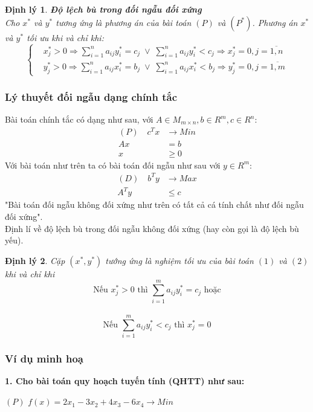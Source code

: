 \documentclass{article}
\newtheorem{dl}{Định lý}
\begin{document}
\begin{dl}{\textbf{Độ lệch bù trong đối ngẫu đối xứng}}\\
    Cho $x^*$ và $y^*$ tương ứng là phương án của bài toán $(P)$ và $(P^*)$. Phương án $x^*$ và $y^*$ tối ưu khi và chỉ khi:
    \[\left\{\begin{aligned}
        & x_j^* > 0 \Longrightarrow \displaystyle\sum\limits_{i=1}^na_{ij}y_i^*=c_j \;\vee\;\displaystyle\sum\limits_{i=1}^na_{ij}y_i^* < c_j\Longrightarrow x_j^* =0,j=\overline{1,n}\\
        & y_j^* > 0 \Longrightarrow \displaystyle\sum\limits_{i=1}^na_{ij}x_i^*=b_j \;\vee\;\displaystyle\sum\limits_{i=1}^na_{ij}x_i^* < b_j\Longrightarrow y_j^* =0,j=\overline{1,m}
    \end{aligned}\right.\]
\end{dl}
\subsubsection{Lý thuyết đối ngẫu dạng chính tắc}
Bài toán chính tắc có dạng như sau, với $A \in M_{m \times n},b \in R^m, c \in R^n$:
\begin{equation}
    \begin{split}
        (P) \quad c^Tx &\rightarrow Min \\
        Ax&=b \\
        x &\geq 0
    \end{split}
\end{equation}
Với bài toán như trên ta có bài toán đối ngẫu như sau với $y \in R^m$:
\begin{equation}
    \begin{split}
        (D) \quad b^Ty &\rightarrow Max \\
        A^Ty &\leq c
    \end{split}
\end{equation}
"Bài toán đối ngẫu không đối xứng như trên có tất cả cá tính chất như đối ngẫu đối xứng". \\
Định lí về độ lệch bù trong đối ngẫu không đối xứng (hay còn gọi là độ lệch bù yếu).
\begin{dl}
Cặp $(x^*,y^*)$ tướng ứng là nghiệm tối ưu của bài toán $(1)$ và $(2)$ khi và chỉ khi
\[\text{Nếu } x_j^* > 0 \text{ thì } \sum_{i=1}^ma_{ij}y_i^*=c_j \text{ hoặc}\] \\
\[\text{Nếu } \sum_{i=1}^ma_{ij}y_i^* < c_j \text{ thì } x_j^*=0\]
\end{dl}
\subsubsection{Ví dụ minh hoạ}
\hspace{-1cm}
\textbf{1. Cho bài toán quy hoạch tuyến tính (QHTT) như sau:}\\
\vspace{-0.4cm}
\begin{center}
$\left(P\right)$ \quad $f(x)=2x_1-3x_2+4x_3-6x_4\longrightarrow Min$\\
\end{center}\\
\end{document}
